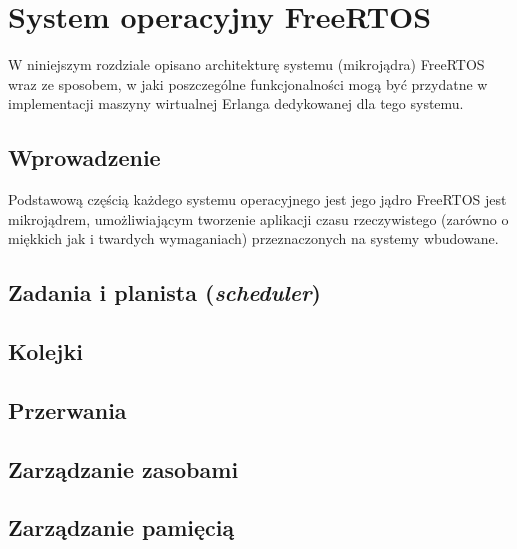 \chapter{System operacyjny FreeRTOS}
\label{cha:freertos}

W niniejszym rozdziale opisano architekturę systemu (mikrojądra) FreeRTOS wraz ze sposobem, w jaki
poszczególne funkcjonalności mogą być przydatne w implementacji maszyny wirtualnej Erlanga dedykowanej
dla tego systemu.

\section{Wprowadzenie}
\label{sec:rtosWprowadzenie}

Podstawową częścią każdego systemu operacyjnego jest jego jądro
FreeRTOS jest mikrojądrem, umożliwiającym tworzenie aplikacji czasu rzeczywistego (zarówno o miękkich jak i twardych wymaganiach) przeznaczonych na systemy wbudowane. 

\section{Zadania i planista (\emph{scheduler})}
\label{sec:rtosScheduler}

\section{Kolejki}
\label{sec:rtosKolejki}

\section{Przerwania}
\label{sec:rtosPrzerwania}

\section{Zarządzanie zasobami}
\label{sec:rtosZasoby}

\section{Zarządzanie pamięcią}
\label{sec:rtosPamiec}

